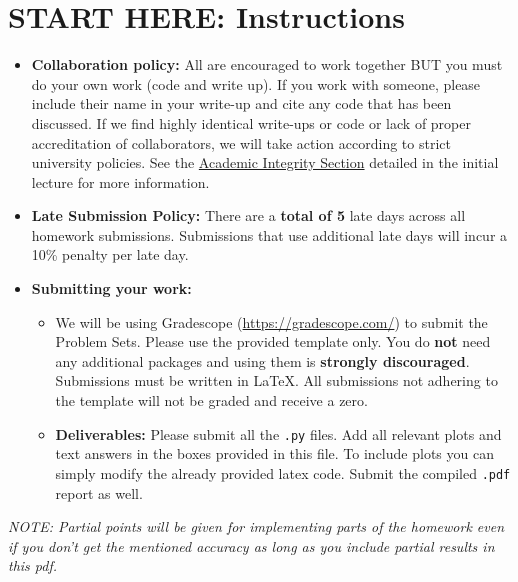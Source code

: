 \section*{START HERE: Instructions}
\begin{itemize}
\item \textbf{Collaboration policy:} All are encouraged to work together BUT you must do your own work (code and write up). If you work with someone, please include their name in your write-up and cite any code that has been discussed. If we find highly identical write-ups or code or lack of proper accreditation of collaborators, we will take action according to strict university policies. See the \href{hhttps://www.cmu.edu/policies/student-and-student-life/academic-integrity.html}{Academic Integrity Section} detailed in the initial lecture for more information.

\item\textbf{Late Submission Policy:} There are a \textbf{total of 5} late days across all homework submissions. Submissions that use additional late days will incur a 10\% penalty per late day.

\item\textbf{Submitting your work:}

\begin{itemize}

\item We will be using Gradescope (\url{https://gradescope.com/}) to submit the Problem Sets. Please use the provided template only. You do \textbf{not} need any additional packages and using them is \textbf{strongly discouraged}. Submissions must be written in LaTeX. All submissions not adhering to the template will not be graded and receive a zero. 
\item \textbf{Deliverables:} Please submit all the \texttt{.py} files. Add all relevant plots and text answers in the boxes provided in this file. To include plots you can simply modify the already provided latex code. Submit the compiled \texttt{.pdf} report as well.
\end{itemize}
\end{itemize}
\emph{NOTE: Partial points will be given for implementing parts of the homework even if you don't get the mentioned accuracy as long as you include partial results in this pdf.}
\clearpage


